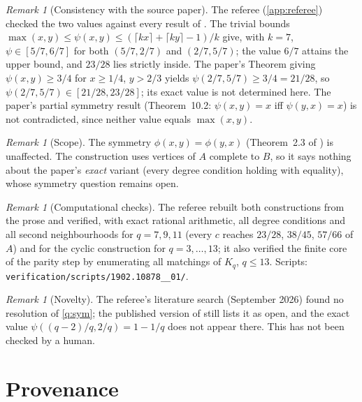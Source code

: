 \documentclass[11pt,a4paper]{article}
\theoremstyle{plain}
\theoremstyle{definition}
\theoremstyle{remark}
\newtheorem{remark}[theorem]{Remark}
\begin{document}
\begin{remark}[Consistency with the source paper]
The referee (\cref{app:referee}) checked the two values against every result of \cite{CHSSS}. The trivial bounds $\max(x,y)\le\psi(x,y)\le(\lceil kx\rceil+\lceil ky\rceil-1)/k$ give, with $k=7$, $\psi\in[5/7,6/7]$ for both $(5/7,2/7)$ and $(2/7,5/7)$; the value $6/7$ attains the upper bound, and $23/28$ lies strictly inside. The paper's Theorem giving $\psi(x,y)\ge3/4$ for $x\ge1/4$, $y>2/3$ yields $\psi(2/7,5/7)\ge3/4=21/28$, so $\psi(2/7,5/7)\in[21/28,23/28]$; its exact value is not determined here. The paper's partial symmetry result (Theorem~10.2: $\psi(x,y)=x$ iff $\psi(y,x)=x$) is not contradicted, since neither value equals $\max(x,y)$.
\end{remark}

\begin{remark}[Scope]
The symmetry $\phi(x,y)=\phi(y,x)$ (Theorem~2.3 of \cite{CHSSS}) is unaffected. The construction uses vertices of $A$ complete to $B$, so it says nothing about the paper's \emph{exact} variant (every degree condition holding with equality), whose symmetry question remains open.
\end{remark}

\begin{remark}[Computational checks]
The referee rebuilt both constructions from the prose and verified, with exact rational arithmetic, all degree conditions and all second neighbourhoods for $q=7,9,11$ (every $c$ reaches $23/28$, $38/45$, $57/66$ of $A$) and for the cyclic construction for $q=3,\dots,13$; it also verified the finite core of the parity step by enumerating all matchings of $K_q$, $q\le13$. Scripts: \texttt{verification/scripts/1902.10878\_\_01/}.
\end{remark}

\begin{remark}[Novelty]
The referee's literature search (September 2026) found no resolution of \cref{q:sym}; the published version of \cite{CHSSS} still lists it as open, and the exact value $\psi((q-2)/q,2/q)=1-1/q$ does not appear there. This has not been checked by a human.
\end{remark}

\section{Provenance}\label{sec:provenance}
\end{document}
